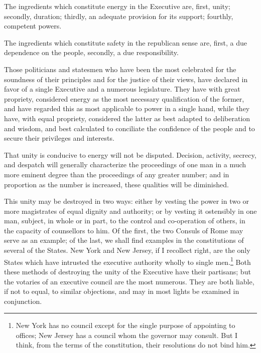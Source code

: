 The ingredients which constitute energy in the Executive are, first, unity; secondly, duration; thirdly, an adequate provision for its support; fourthly, competent powers.

The ingredients which constitute safety in the republican sense are, first, a due dependence on the people, secondly, a due responsibility.

Those politicians and statesmen who have been the most celebrated for the soundness of their principles and for the justice of their views, have declared in favor of a single Executive and a numerous legislature. They have with great propriety, considered energy as the most necessary qualification of the former, and have regarded this as most applicable to power in a single hand, while they have, with equal propriety, considered the latter as best adapted to deliberation and wisdom, and best calculated to conciliate the confidence of the people and to secure their privileges and interests.

That unity is conducive to energy will not be disputed. Decision, activity, secrecy, and despatch will generally characterize the proceedings of one man in a much more eminent degree than the proceedings of any greater number; and in proportion as the number is increased, these qualities will be diminished.

This unity may be destroyed in two ways: either by vesting the power in two or more magistrates of equal dignity and authority; or by vesting it ostensibly in one man, subject, in whole or in part, to the control and co-operation of others, in the capacity of counsellors to him. Of the first, the two Consuls of Rome may serve as an example; of the last, we shall find examples in the constitutions of several of the States. New York and New Jersey, if I recollect right, are the only States which have intrusted the executive authority wholly to single men.\footnote{New York has no council except for the single purpose of appointing to offices; New Jersey has a council whom the governor may consult. But I think, from the terms of the constitution, their resolutions do not bind him.} Both these methods of destroying the unity of the Executive have their partisans; but the votaries of an executive council are the most numerous. They are both liable, if not to equal, to similar objections, and may in most lights be examined in conjunction.

